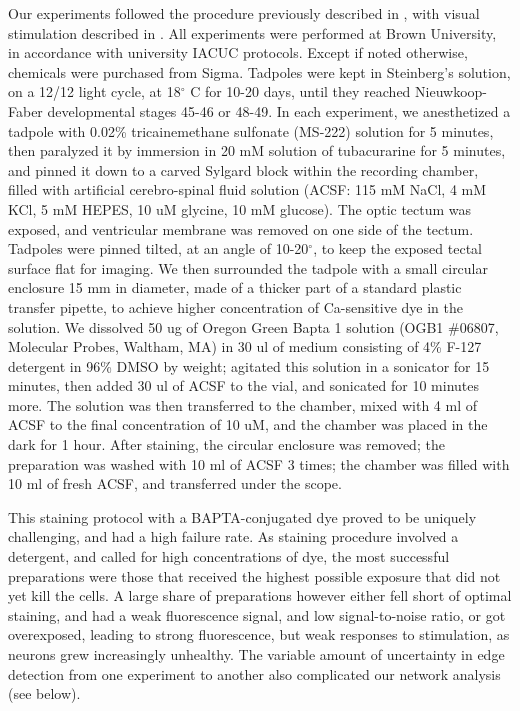 \documentclass{article}
\begin{document}
Our experiments followed the procedure previously described in \citep{xu2011,truszkowski2017}, with visual stimulation described in \citep{khakhalin2014}. All experiments were performed at Brown University, in accordance with university IACUC protocols. Except if noted otherwise, chemicals were purchased from Sigma. Tadpoles were kept in Steinberg’s solution, on a 12/12 light cycle, at 18$^\circ$ C for 10-20 days, until they reached Nieuwkoop-Faber developmental stages 45-46 or 48-49. In each experiment, we anesthetized a tadpole with 0.02\% tricainemethane sulfonate (MS-222) solution for 5 minutes, then paralyzed it by immersion in 20 mM solution of tubacurarine for 5 minutes, and pinned it down to a carved Sylgard block within the recording chamber, filled with artificial cerebro-spinal fluid solution (ACSF: 115 mM NaCl, 4 mM KCl, 5 mM HEPES, 10 uM glycine, 10 mM glucose). The optic tectum was exposed, and ventricular membrane was removed on one side of the tectum. Tadpoles were pinned tilted, at an angle of 10-20$^\circ$, to keep the exposed tectal surface flat for imaging. We then surrounded the tadpole with a small circular enclosure 15 mm in diameter, made of a thicker part of a standard plastic transfer pipette, to achieve higher concentration of Ca-sensitive dye in the solution. We dissolved 50 ug of Oregon Green Bapta 1 solution (OGB1 $\#$06807, Molecular Probes, Waltham, MA) in 30 ul of medium consisting of 4\% F-127 detergent in 96\% DMSO by weight; agitated this solution in a sonicator for 15 minutes, then added 30 ul of ACSF to the vial, and sonicated for 10 minutes more. The solution was then transferred to the chamber, mixed with 4 ml of ACSF to the final concentration of 10 uM, and the chamber was placed in the dark for 1 hour. After staining, the circular enclosure was removed; the preparation was washed with 10 ml of ACSF 3 times; the chamber was filled with 10 ml of fresh ACSF, and transferred under the scope.

This staining protocol with a BAPTA-conjugated dye proved to be uniquely challenging, and had a high failure rate. As staining procedure involved a detergent, and called for high concentrations of dye, the most successful preparations were those that received the highest possible exposure that did not yet kill the cells. A large share of preparations however either fell short of optimal staining, and had a weak fluorescence signal, and low signal-to-noise ratio, or got overexposed, leading to strong fluorescence, but weak responses to stimulation, as neurons grew increasingly unhealthy. The variable amount of uncertainty in edge detection from one experiment to another also complicated our network analysis (see below).
\end{document}
